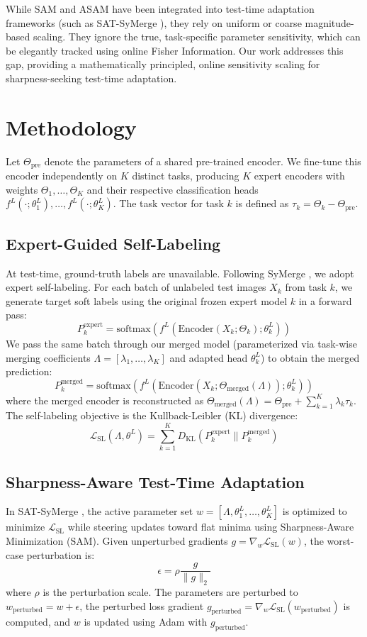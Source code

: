 \documentclass{article}
\theoremstyle{plain}
\theoremstyle{definition}
\theoremstyle{remark}
\begin{document}
While SAM and ASAM have been integrated into test-time adaptation frameworks (such as SAT-SyMerge \cite{submission1}), they rely on uniform or coarse magnitude-based scaling. They ignore the true, task-specific parameter sensitivity, which can be elegantly tracked using online Fisher Information. Our work addresses this gap, providing a mathematically principled, online sensitivity scaling for sharpness-seeking test-time adaptation.

\section{Methodology}
\label{sec:method}
Let $\Theta_{\text{pre}}$ denote the parameters of a shared pre-trained encoder. We fine-tune this encoder independently on $K$ distinct tasks, producing $K$ expert encoders with weights $\Theta_1, \dots, \Theta_K$ and their respective classification heads $f^L(\cdot; \theta^L_1), \dots, f^L(\cdot; \theta^L_K)$. The task vector for task $k$ is defined as $\tau_k = \Theta_k - \Theta_{\text{pre}}$.

\subsection{Expert-Guided Self-Labeling}
At test-time, ground-truth labels are unavailable. Following SyMerge \cite{jung2025symerge}, we adopt expert self-labeling. For each batch of unlabeled test images $X_k$ from task $k$, we generate target soft labels using the original frozen expert model $k$ in a forward pass:
$$P_k^{\text{expert}} = \text{softmax}(f^L(\text{Encoder}(X_k; \Theta_k); \theta^L_k))$$
We pass the same batch through our merged model (parameterized via task-wise merging coefficients $\Lambda = [\lambda_1, \dots, \lambda_K]$ and adapted head $\theta^L_k$) to obtain the merged prediction:
$$P_k^{\text{merged}} = \text{softmax}(f^L(\text{Encoder}(X_k; \Theta_{\text{merged}}(\Lambda)); \theta^L_k))$$
where the merged encoder is reconstructed as $\Theta_{\text{merged}}(\Lambda) = \Theta_{\text{pre}} + \sum_{k=1}^K \lambda_k \tau_k$.
The self-labeling objective is the Kullback-Leibler (KL) divergence:
$$\mathcal{L}_{\text{SL}}(\Lambda, \theta^L) = \sum_{k=1}^K D_{\text{KL}}(P_k^{\text{expert}} \parallel P_k^{\text{merged}})$$

\subsection{Sharpness-Aware Test-Time Adaptation}
In SAT-SyMerge \cite{submission1}, the active parameter set $w = [\Lambda, \theta^L_1, \dots, \theta^L_K]$ is optimized to minimize $\mathcal{L}_{\text{SL}}$ while steering updates toward flat minima using Sharpness-Aware Minimization (SAM). Given unperturbed gradients $g = \nabla_w \mathcal{L}_{\text{SL}}(w)$, the worst-case perturbation is:
$$\epsilon = \rho \frac{g}{\|g\|_2}$$
where $\rho$ is the perturbation scale. The parameters are perturbed to $w_{\text{perturbed}} = w + \epsilon$, the perturbed loss gradient $g_{\text{perturbed}} = \nabla_w \mathcal{L}_{\text{SL}}(w_{\text{perturbed}})$ is computed, and $w$ is updated using Adam with $g_{\text{perturbed}}$.
\end{document}
